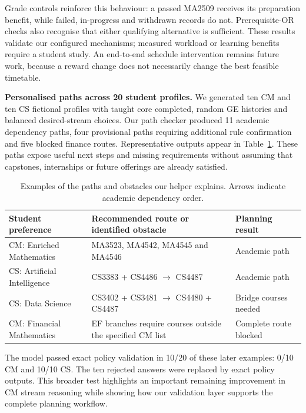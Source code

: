 \documentclass{article}
\begin{document}
Grade controls reinforce this behaviour: a passed MA2509 receives its preparation benefit, while failed, in-progress and withdrawn records do not. Prerequisite-OR checks also recognise that either qualifying alternative is sufficient. These results validate our configured mechanisms; measured workload or learning benefits require a student study. An end-to-end schedule intervention remains future work, because a reward change does not necessarily change the best feasible timetable.

\textbf{Personalised paths across 20 student profiles.} We generated ten CM and ten CS fictional profiles with taught core completed, random GE histories and balanced desired-stream choices. Our path checker produced 11 academic dependency paths, four provisional paths requiring additional rule confirmation and five blocked finance routes. Representative outputs appear in Table~\ref{tab:examples}. These paths expose useful next steps and missing requirements without assuming that capstones, internships or future offerings are already satisfied.

\begin{table}[H]
\centering\small
\caption{Examples of the paths and obstacles our helper explains. Arrows indicate academic dependency order.}
\begin{tabular}{p{1.4in}p{2.2in}p{1.4in}}
\toprule
Student preference & Recommended route or identified obstacle & Planning result\\
\midrule
CM: Enriched Mathematics & MA3523, MA4542, MA4545 and MA4546 & Academic path\\
CS: Artificial Intelligence & CS3383 + CS4486 $\rightarrow$ CS4487 & Academic path\\
CS: Data Science & CS3402 + CS3481 $\rightarrow$ CS4480 + CS4487 & Bridge courses needed\\
CM: Financial Mathematics & EF branches require courses outside the specified CM list & Complete route blocked\\
\bottomrule
\end{tabular}
\label{tab:examples}
\end{table}

The model passed exact policy validation in 10/20 of these later examples: 0/10 CM and 10/10 CS. The ten rejected answers were replaced by exact policy outputs. This broader test highlights an important remaining improvement in CM stream reasoning while showing how our validation layer supports the complete planning workflow.
\end{document}
